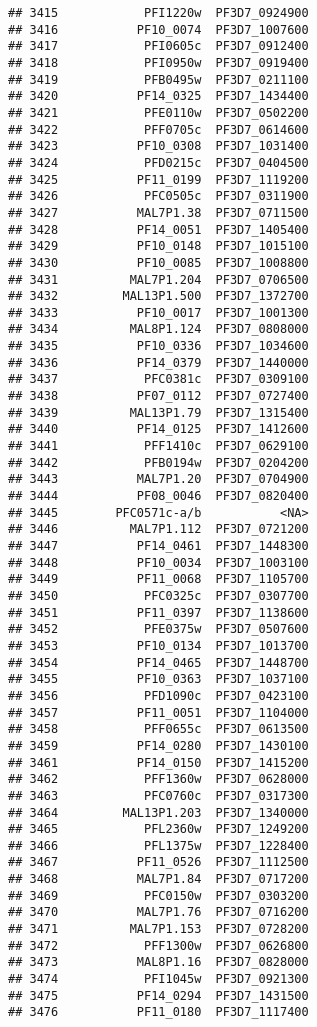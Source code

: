\documentclass{article}\usepackage[]{graphicx}\usepackage[]{color}
\makeatletter
\newenvironment{kframe}{%
 \def\at@end@of@kframe{}%
 \ifinner\ifhmode%
  \def\at@end@of@kframe{\end{minipage}}%
  \begin{minipage}{\columnwidth}%
 \fi\fi%
 \def\FrameCommand##1{\hskip\@totalleftmargin \hskip-\fboxsep
 \colorbox{shadecolor}{##1}\hskip-\fboxsep
     \hskip-\linewidth \hskip-\@totalleftmargin \hskip\columnwidth}%
 \MakeFramed {\advance\hsize-\width
   \@totalleftmargin\z@ \linewidth\hsize
   \@setminipage}}%
 {\par\unskip\endMakeFramed%
 \at@end@of@kframe}
\newenvironment{knitrout}{}{} %
\makeatother
\begin{document}
\begin{knitrout}
\begin{kframe}
\begin{verbatim}
## 3415            PFI1220w  PF3D7_0924900
## 3416           PF10_0074  PF3D7_1007600
## 3417            PFI0605c  PF3D7_0912400
## 3418            PFI0950w  PF3D7_0919400
## 3419            PFB0495w  PF3D7_0211100
## 3420           PF14_0325  PF3D7_1434400
## 3421            PFE0110w  PF3D7_0502200
## 3422            PFF0705c  PF3D7_0614600
## 3423           PF10_0308  PF3D7_1031400
## 3424            PFD0215c  PF3D7_0404500
## 3425           PF11_0199  PF3D7_1119200
## 3426            PFC0505c  PF3D7_0311900
## 3427           MAL7P1.38  PF3D7_0711500
## 3428           PF14_0051  PF3D7_1405400
## 3429           PF10_0148  PF3D7_1015100
## 3430           PF10_0085  PF3D7_1008800
## 3431          MAL7P1.204  PF3D7_0706500
## 3432         MAL13P1.500  PF3D7_1372700
## 3433           PF10_0017  PF3D7_1001300
## 3434          MAL8P1.124  PF3D7_0808000
## 3435           PF10_0336  PF3D7_1034600
## 3436           PF14_0379  PF3D7_1440000
## 3437            PFC0381c  PF3D7_0309100
## 3438           PF07_0112  PF3D7_0727400
## 3439          MAL13P1.79  PF3D7_1315400
## 3440           PF14_0125  PF3D7_1412600
## 3441            PFF1410c  PF3D7_0629100
## 3442            PFB0194w  PF3D7_0204200
## 3443           MAL7P1.20  PF3D7_0704900
## 3444           PF08_0046  PF3D7_0820400
## 3445        PFC0571c-a/b           <NA>
## 3446          MAL7P1.112  PF3D7_0721200
## 3447           PF14_0461  PF3D7_1448300
## 3448           PF10_0034  PF3D7_1003100
## 3449           PF11_0068  PF3D7_1105700
## 3450            PFC0325c  PF3D7_0307700
## 3451           PF11_0397  PF3D7_1138600
## 3452            PFE0375w  PF3D7_0507600
## 3453           PF10_0134  PF3D7_1013700
## 3454           PF14_0465  PF3D7_1448700
## 3455           PF10_0363  PF3D7_1037100
## 3456            PFD1090c  PF3D7_0423100
## 3457           PF11_0051  PF3D7_1104000
## 3458            PFF0655c  PF3D7_0613500
## 3459           PF14_0280  PF3D7_1430100
## 3461           PF14_0150  PF3D7_1415200
## 3462            PFF1360w  PF3D7_0628000
## 3463            PFC0760c  PF3D7_0317300
## 3464         MAL13P1.203  PF3D7_1340000
## 3465            PFL2360w  PF3D7_1249200
## 3466            PFL1375w  PF3D7_1228400
## 3467           PF11_0526  PF3D7_1112500
## 3468           MAL7P1.84  PF3D7_0717200
## 3469            PFC0150w  PF3D7_0303200
## 3470           MAL7P1.76  PF3D7_0716200
## 3471          MAL7P1.153  PF3D7_0728200
## 3472            PFF1300w  PF3D7_0626800
## 3473           MAL8P1.16  PF3D7_0828000
## 3474            PFI1045w  PF3D7_0921300
## 3475           PF14_0294  PF3D7_1431500
## 3476           PF11_0180  PF3D7_1117400

\end{verbatim}
\end{kframe}
\end{knitrout}
\end{document}

